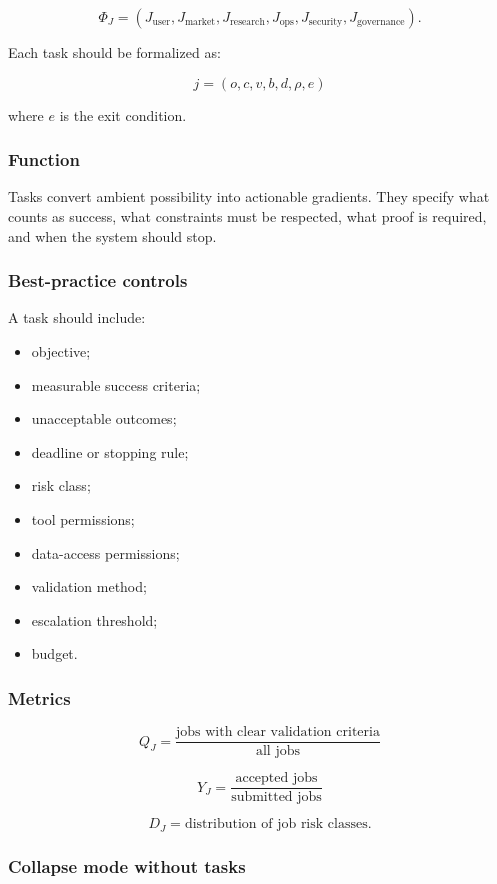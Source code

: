 \documentclass[
  11pt,
]{article}
\providecommand{\tightlist}{%
  \setlength{\itemsep}{0pt}\setlength{\parskip}{0pt}}
\begin{document}
\[
\Phi_J=(J_{\text{user}},J_{\text{market}},J_{\text{research}},J_{\text{ops}},J_{\text{security}},J_{\text{governance}}).
\]

Each task should be formalized as:

\[
j=(o,c,v,b,d,\rho,e)
\]

where \(e\) is the exit condition.

\subsubsection{Function}\label{function-2}

Tasks convert ambient possibility into actionable gradients. They
specify what counts as success, what constraints must be respected, what
proof is required, and when the system should stop.

\subsubsection{Best-practice controls}\label{best-practice-controls-2}

A task should include:

\begin{itemize}
\tightlist
\item
  objective;
\item
  measurable success criteria;
\item
  unacceptable outcomes;
\item
  deadline or stopping rule;
\item
  risk class;
\item
  tool permissions;
\item
  data-access permissions;
\item
  validation method;
\item
  escalation threshold;
\item
  budget.
\end{itemize}

\subsubsection{Metrics}\label{metrics-2}

\[
Q_J=\frac{\text{jobs with clear validation criteria}}{\text{all jobs}}
\]

\[
Y_J=\frac{\text{accepted jobs}}{\text{submitted jobs}}
\]

\[
D_J=\text{distribution of job risk classes}.
\]

\subsubsection{Collapse mode without
tasks}\label{collapse-mode-without-tasks}
\end{document}
